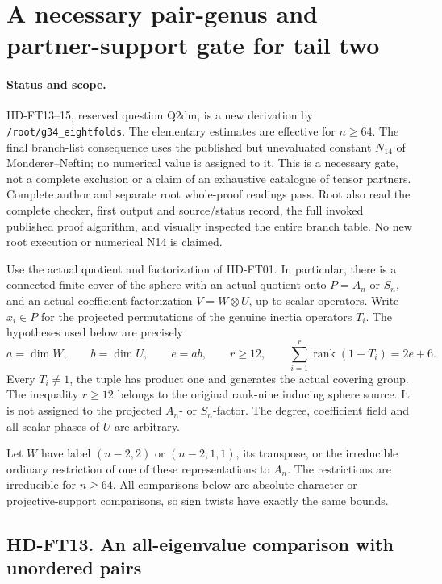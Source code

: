 \section{A necessary pair-genus and partner-support gate for tail two}
\label{sec:factorwise-two-tail-gate}

\paragraph{Status and scope.}
HD-FT13--15, reserved question Q2dm, is a new derivation by
\texttt{/root/g34\_eightfolds}.  The elementary estimates are effective
for \(n\ge64\).  The final branch-list consequence uses the published
but unevaluated constant \(N_{14}\) of Monderer--Neftin; no numerical
value is assigned to it.  This is a necessary gate, not a complete
exclusion or a claim of an exhaustive catalogue of tensor partners.
Complete author and separate root whole-proof readings pass. Root also read the complete checker, first output and source/status record, the full invoked published proof algorithm, and visually inspected the entire branch table. No new root execution or numerical N14 is claimed.

Use the actual quotient and factorization of HD-FT01.  In particular,
there is a connected finite cover of the sphere with an actual quotient
onto \(P=A_n\) or \(S_n\), and an actual coefficient factorization
\(V=W\otimes U\), up to scalar operators.  Write \(x_i\in P\) for
the projected permutations of the genuine inertia operators \(T_i\).
The hypotheses used below are precisely
\[
 a=\dim W,\qquad b=\dim U,\qquad e=ab,\qquad r\ge12,
 \qquad \sum_{i=1}^r\operatorname{rank}(1-T_i)=2e+6.
 \tag{FT2P.1}
\]
Every \(T_i\ne1\), the tuple has product one and generates the actual
covering group.  The inequality \(r\ge12\) belongs to the original
rank-nine inducing sphere source.  It is not assigned to the projected
\(A_n\)- or \(S_n\)-factor.  The degree, coefficient field and all
scalar phases of \(U\) are arbitrary.

Let \(W\) have label \((n-2,2)\) or \((n-2,1,1)\), its transpose,
or the irreducible ordinary restriction of one of these representations
to \(A_n\).  The restrictions are irreducible for \(n\ge64\).
All comparisons below are absolute-character or projective-support
comparisons, so sign twists have exactly the same bounds.

\subsection*{HD-FT13. An all-eigenvalue comparison with unordered pairs}


